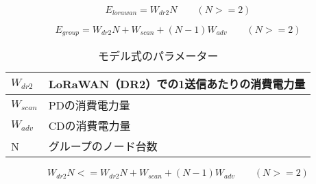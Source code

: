 \begin{equation}
    \label{fig:model_lora}
    E_{lorawan} = W_{dr2}N \qquad (N>=2)
\end{equation}

\begin{equation}
    \label{fig:model_group}
    E_{group} = W_{dr2}N + W_{scan} + (N-1)W_{adv} \qquad (N>=2)
\end{equation}

\begin{table}[]
    \caption{モデル式のパラメーター}
    \label{fig:model_param}
    \centering
    \begin{tabular}{|l|l|}
    \hline
    $W_{dr2}$  & LoRaWAN（DR2）での1送信あたりの消費電力量 \\ \hline
    $W_{scan}$ & PDの消費電力量                   \\ \hline
    $W_{adv}$  & CDの消費電力量                   \\ \hline
    N           & グループのノード台数                 \\ \hline
    \end{tabular}
\end{table}

\begin{equation}
    \label{fig:model_lora_group}
    W_{dr2}N <= W_{dr2}N + W_{scan} + (N-1)W_{adv} \qquad (N>=2)
\end{equation}